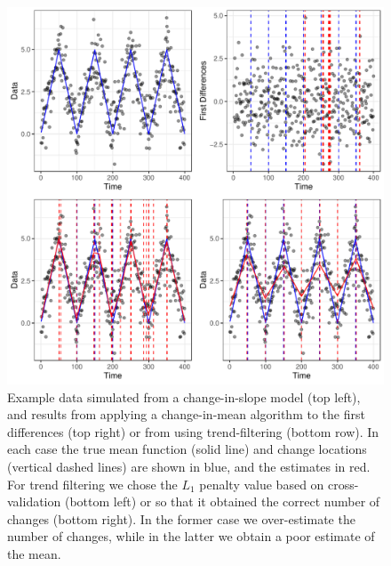 \documentclass[article]{jss}
\begin{document}
\begin{figure}
\centering
\includegraphics[scale=1.4]{figures/change_in_slope_examples_ggplot.pdf}
\caption{ Example data simulated from a change-in-slope model (top left), and results from applying a change-in-mean algorithm to the first differences (top right) or from using trend-filtering (bottom row). In each case the true mean function (solid line) and change locations (vertical dashed lines) are shown in blue, and the estimates in red.  For trend filtering we chose the $L_1$ penalty value based on cross-validation (bottom left) or so that it obtained the correct number of changes (bottom right). In the former case we over-estimate the number of changes, while in the latter we obtain a poor estimate of the mean.
\label{fig:intro}}
\end{figure}
\end{document}
